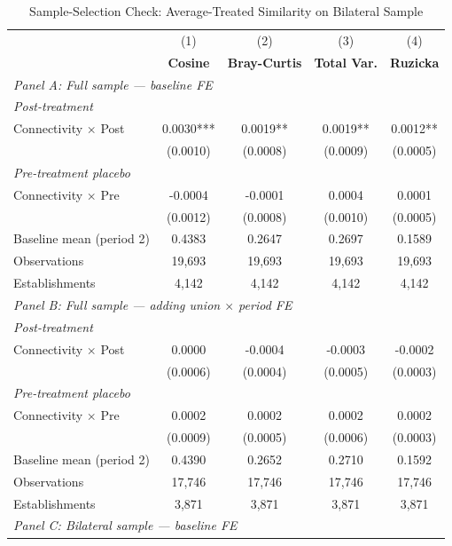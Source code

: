 \begin{table}[H]
\centering
\caption{Sample-Selection Check: Average-Treated Similarity on Bilateral Sample}
\scriptsize
\setlength{\tabcolsep}{6pt}
\begin{tabular}{lcccc}
\hline\hline
 & (1) & (2) & (3) & (4) \\
 & \textbf{Cosine} & \textbf{Bray-Curtis} & \textbf{Total Var.} & \textbf{Ruzicka} \\
\hline
\multicolumn{5}{l}{\textit{Panel A: Full sample — baseline FE}} \\
\multicolumn{5}{l}{\textit{Post-treatment}} \\
Connectivity $\times$ Post & 0.0030*** & 0.0019** & 0.0019** & 0.0012** \\
 & (0.0010) & (0.0008) & (0.0009) & (0.0005) \\
\multicolumn{5}{l}{\textit{Pre-treatment placebo}} \\
Connectivity $\times$ Pre & -0.0004 & -0.0001 & 0.0004 & 0.0001 \\
 & (0.0012) & (0.0008) & (0.0010) & (0.0005) \\
\hline
Baseline mean (period 2) & 0.4383 & 0.2647 & 0.2697 & 0.1589 \\
Observations &       19,693 &       19,693 &       19,693 &       19,693 \\
Establishments &        4,142 &        4,142 &        4,142 &        4,142 \\
\hline
\multicolumn{5}{l}{\textit{Panel B: Full sample — adding union $\times$ period FE}} \\
\multicolumn{5}{l}{\textit{Post-treatment}} \\
Connectivity $\times$ Post & 0.0000 & -0.0004 & -0.0003 & -0.0002 \\
 & (0.0006) & (0.0004) & (0.0005) & (0.0003) \\
\multicolumn{5}{l}{\textit{Pre-treatment placebo}} \\
Connectivity $\times$ Pre & 0.0002 & 0.0002 & 0.0002 & 0.0002 \\
 & (0.0009) & (0.0005) & (0.0006) & (0.0003) \\
\hline
Baseline mean (period 2) & 0.4390 & 0.2652 & 0.2710 & 0.1592 \\
Observations &       17,746 &       17,746 &       17,746 &       17,746 \\
Establishments &        3,871 &        3,871 &        3,871 &        3,871 \\
\hline
\multicolumn{5}{l}{\textit{Panel C: Bilateral sample — baseline FE}} \\

\end{tabular}
\end{table}
